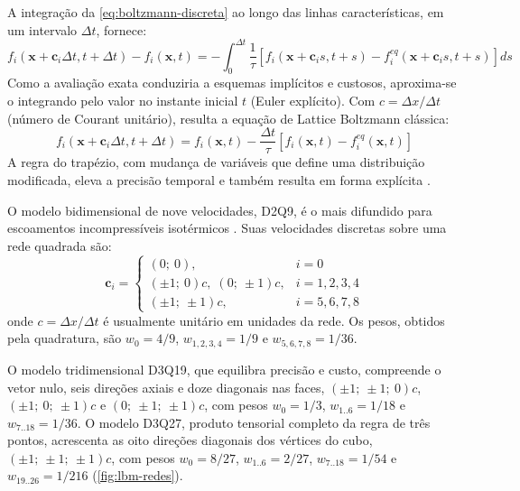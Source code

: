 A integração da \autoref{eq:boltzmann-discreta} ao longo das linhas características, em um intervalo $\Delta t$, fornece:
\begin{equation}
    f_i(\mathbf{x} + \mathbf{c}_i \Delta t, t + \Delta t) - f_i(\mathbf{x}, t) = -\int_{0}^{\Delta t} \frac{1}{\tau} \left[ f_i(\mathbf{x} + \mathbf{c}_i s, t + s) - f_i^{eq}(\mathbf{x} + \mathbf{c}_i s, t + s) \right] ds
\end{equation}
Como a avaliação exata conduziria a esquemas implícitos e custosos, aproxima-se o integrando pelo valor no instante inicial $t$ (Euler explícito).
Com $c = \Delta x / \Delta t$ (número de Courant unitário), resulta a equação de Lattice Boltzmann clássica:
\begin{equation}
    f_i(\mathbf{x} + \mathbf{c}_i \Delta t, t + \Delta t) = f_i(\mathbf{x}, t) - \frac{\Delta t}{\tau} [ f_i(\mathbf{x}, t) - f_i^{eq}(\mathbf{x}, t) ]
\end{equation}
A regra do trapézio, com mudança de variáveis que define uma distribuição modificada, eleva a precisão temporal e também resulta em forma explícita \parencite{He1997}.

O modelo bidimensional de nove velocidades, D2Q9, é o mais difundido para escoamentos incompressíveis isotérmicos \parencite{Qian1992, Chen1998}.
Suas velocidades discretas sobre uma rede quadrada são:
\begin{equation}
    \mathbf{c}_i = \begin{cases} 
      (0;\ 0), & i=0 \\ 
      (\pm 1;\ 0)c, \; (0;\ \pm 1)c, & i=1,2,3,4 \\ 
      (\pm 1;\ \pm 1)c, & i=5,6,7,8 
    \end{cases}
\end{equation}
onde $c = \Delta x / \Delta t$ é usualmente unitário em unidades da rede.
Os pesos, obtidos pela quadratura, são $w_0 = 4/9$, $w_{1,2,3,4} = 1/9$ e $w_{5,6,7,8} = 1/36$.

O modelo tridimensional D3Q19, que equilibra precisão e custo, compreende o vetor nulo, seis direções axiais e doze diagonais nas faces, $(\pm 1;\ \pm 1;\ 0)c$, $(\pm 1;\ 0;\ \pm 1)c$ e $(0;\ \pm 1;\ \pm 1)c$, com pesos $w_0 = 1/3$, $w_{1..6} = 1/18$ e $w_{7..18} = 1/36$.
O modelo D3Q27, produto tensorial completo da regra de três pontos, acrescenta as oito direções diagonais dos vértices do cubo, $(\pm 1;\ \pm 1;\ \pm 1)c$, com pesos $w_0 = 8/27$, $w_{1..6} = 2/27$, $w_{7..18} = 1/54$ e $w_{19..26} = 1/216$ (\autoref{fig:lbm-redes}).

